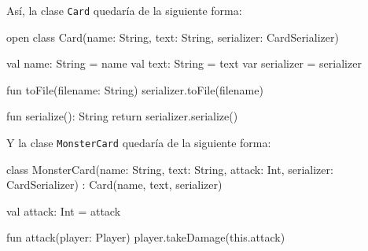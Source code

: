   Así, la clase \texttt{Card} quedaría de la siguiente forma:

  \begin{kotlin}
    open class Card(name: String, text: String, serializer: CardSerializer) {
      val name: String = name
      val text: String = text
      var serializer = serializer

      fun toFile(filename: String) {
        serializer.toFile(filename)
      }

      fun serialize(): String {
        return serializer.serialize()
      }
    }
  \end{kotlin}

  Y la clase \texttt{MonsterCard} quedaría de la siguiente forma:

  \begin{kotlin}
    class MonsterCard(name: String, text: String, attack: Int, serializer: CardSerializer) :
        Card(name, text, serializer) {
      val attack: Int = attack

      fun attack(player: Player) {
        player.takeDamage(this.attack)
      }
    }
  \end{kotlin}

